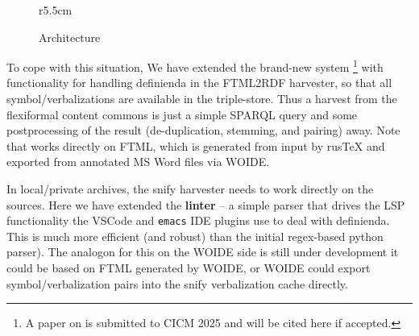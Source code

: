 \documentclass[runningheads]{llncs}
\newcommand\snify{\textsf{snify}\xspace}
\begin{document}
\begin{figure}r{5.5cm}\vspace*{-2em}
  \caption{Architecture}\label{fig:arch}\vspace*{-1em}
\end{figure}
To cope with this situation, We have extended the brand-new \flams system
\cite{flams:on}\footnote{A paper on \flams is submitted to CICM 2025 and will be cited
  here if accepted.} with functionality for handling definienda in the FTML2RDF harvester,
so that all symbol/verbalizations are available in the \flams triple-store. Thus a harvest
from the flexiformal content commons is just a simple SPARQL query and some postprocessing
of the result (de-duplication, stemming, and pairing) away. Note that \flams works
directly on FTML, which is generated from \sTeX input by \textsf{rus\TeX} and exported
from annotated MS Word files via WOIDE.

In local/private archives, the \snify harvester needs to work directly on the \sTeX
sources. Here we have extended the \flams \textbf{linter} -- a simple \sTeX parser that
drives the LSP functionality the VSCode and \texttt{emacs} \sTeX IDE plugins use to deal
with definienda. This is much more efficient (and robust) than the initial regex-based
python parser). The analogon for this on the WOIDE side is still under development it
could be based on FTML generated by WOIDE, or WOIDE could export symbol/verbalization
pairs into the \snify verbalization cache directly.
\end{document}
